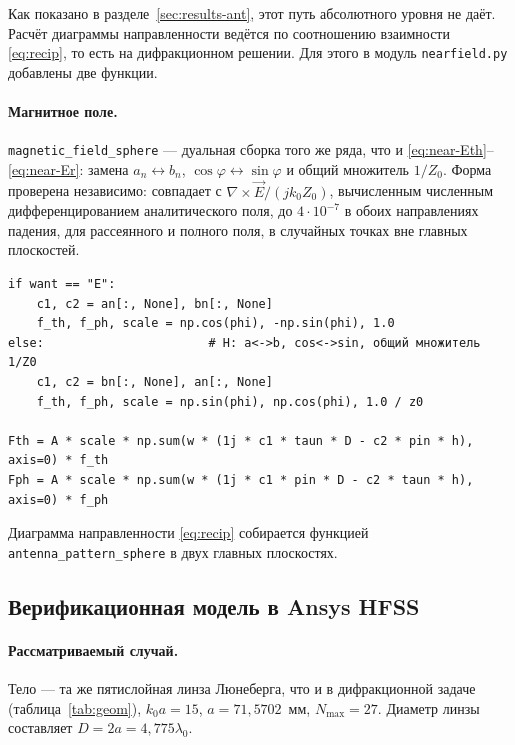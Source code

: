 \documentclass[11pt,a4paper]{article}
\begin{document}
Как показано в разделе~\ref{sec:results-ant}, этот путь абсолютного уровня не даёт.
Расчёт диаграммы направленности ведётся по соотношению взаимности
\eqref{eq:recip}, то есть на дифракционном решении. Для этого в модуль
\texttt{nearfield.py} добавлены две функции.

\paragraph{Магнитное поле.}
\texttt{magnetic\_field\_sphere} --- дуальная сборка того же ряда, что и
\eqref{eq:near-Eth}--\eqref{eq:near-Er}: замена $a_n\leftrightarrow b_n$,
$\cos\varphi\leftrightarrow\sin\varphi$ и общий множитель $1/Z_0$. Форма проверена
независимо: совпадает с $\nabla\times\vec E/(jk_0Z_0)$, вычисленным численным
дифференцированием аналитического поля, до $4\cdot10^{-7}$ в обоих направлениях
падения, для рассеянного и полного поля, в случайных точках вне главных плоскостей.

\begin{lstlisting}[style=py,caption={\texttt{nearfield.py::\_series} ---
дуальная сборка магнитного поля},label={lst:mag}]
if want == "E":
    c1, c2 = an[:, None], bn[:, None]
    f_th, f_ph, scale = np.cos(phi), -np.sin(phi), 1.0
else:                       # H: a<->b, cos<->sin, общий множитель 1/Z0
    c1, c2 = bn[:, None], an[:, None]
    f_th, f_ph, scale = np.sin(phi), np.cos(phi), 1.0 / z0

Fth = A * scale * np.sum(w * (1j * c1 * taun * D - c2 * pin * h), axis=0) * f_th
Fph = A * scale * np.sum(w * (1j * c1 * pin * D - c2 * taun * h), axis=0) * f_ph
\end{lstlisting}

Диаграмма направленности \eqref{eq:recip} собирается функцией
\texttt{antenna\_pattern\_sphere} в двух главных плоскостях.

\subsection{Верификационная модель в Ansys HFSS}
\label{sec:model-ant}

\paragraph{Рассматриваемый случай.}
Тело --- та же пятислойная линза Люнеберга, что и в дифракционной задаче
(таблица~\ref{tab:geom}), $k_0a = 15$, $a = 71{,}5702$~мм, $N_{\max} = 27$.
Диаметр линзы составляет $D = 2a = 4{,}775\lambda_0$.
\end{document}
